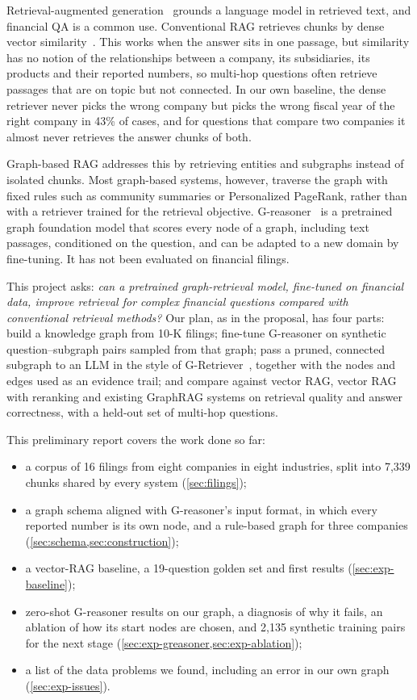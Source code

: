 \documentclass[10pt,twocolumn,letterpaper]{article}
\begin{document}
Retrieval-augmented generation~\cite{lewis2020rag} grounds a language model in retrieved text, and
financial QA is a common use. Conventional RAG retrieves chunks by dense vector
similarity~\cite{karpukhin2020dpr}. This works when the answer sits in one passage, but similarity has
no notion of the relationships between a company, its subsidiaries, its products and their reported
numbers, so multi-hop questions often retrieve passages that are on topic but not connected. In our
own baseline, the dense retriever never picks the wrong company but picks the wrong fiscal year of
the right company in 43\% of cases, and for questions that compare two companies it almost never
retrieves the answer chunks of both.

Graph-based RAG addresses this by retrieving entities and subgraphs instead of isolated chunks.
Most graph-based systems, however, traverse the graph with fixed rules such as community summaries
or Personalized PageRank, rather than with a retriever trained for the retrieval objective.
G-reasoner~\cite{luo2026greasoner} is a pretrained graph foundation model that scores every node of
a graph, including text passages, conditioned on the question, and can be adapted to a new domain by
fine-tuning. It has not been evaluated on financial filings.

This project asks: \emph{can a pretrained graph-retrieval model, fine-tuned on financial data,
improve retrieval for complex financial questions compared with conventional retrieval methods?}
Our plan, as in the proposal, has four parts: build a knowledge graph from 10-K filings; fine-tune
G-reasoner on synthetic question--subgraph pairs sampled from that graph; pass a pruned, connected
subgraph to an LLM in the style of G-Retriever~\cite{he2024gretriever}, together with the nodes and
edges used as an evidence trail; and compare against vector RAG, vector RAG with reranking and
existing GraphRAG systems on retrieval quality and answer correctness, with a held-out set of
multi-hop questions.

This preliminary report covers the work done so far:
\begin{itemize}
  \item a corpus of 16 filings from eight companies in eight industries, split into 7,339 chunks
  shared by every system (\cref{sec:filings});
  \item a graph schema aligned with G-reasoner's input format, in which every reported number is
  its own node, and a rule-based graph for three companies (\cref{sec:schema,sec:construction});
  \item a vector-RAG baseline, a 19-question golden set and first results
  (\cref{sec:exp-baseline});
  \item zero-shot G-reasoner results on our graph, a diagnosis of why it fails, an ablation of how
  its start nodes are chosen, and 2,135 synthetic training pairs for the next stage
  (\cref{sec:exp-greasoner,sec:exp-ablation});
  \item a list of the data problems we found, including an error in our own graph
  (\cref{sec:exp-issues}).
\end{itemize}
\end{document}
